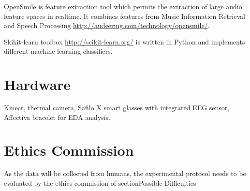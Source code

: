 OpenSmile is feature extraction tool which permits the extraction of large audio feature spaces in realtime. It combines features from Music Information Retrieval and Speech Processing \url{http://audeering.com/technology/opensmile/}.

Skikit-learn toolbox \url{http://scikit-learn.org/} is written in Python and implements different machine learning classifiers.


\section{Hardware}
\label{sec:hardware}
Kinect, thermal camera, Safilo X smart glasses with integrated EEG sensor, Affectiva bracelet for EDA analysis. 






\section{Ethics Commission}

As the data will be collected from humans, the experimental protocol needs to be evaluated by the ethics commission of section{Possible Difficulties}